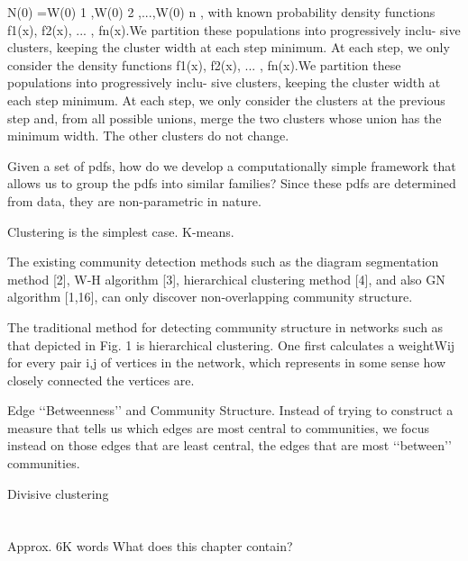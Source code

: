 \documentclass[../main.tex]{subfiles}
\begin{document}
\cite{VoVan2010}
N(0) ={W(0)
1 ,W(0) 2 ,...,W(0) n }, with known probability
density functions {f1(x), f2(x), ... , fn(x)}.We partition these populations into progressively inclu- sive clusters, keeping the cluster width at each step minimum. At each step, we only consider the
density functions {f1(x), f2(x), ... , fn(x)}.We partition these populations into progressively inclu- sive clusters, keeping the cluster width at each step minimum. At each step, we only consider the
clusters at the previous step and, from all possible unions, merge the two clusters whose union
has the minimum width. The other clusters do not change.

\cite{Goh2008}
Given a set of pdfs, how do
we develop a computationally simple framework that allows us to group the pdfs into
similar families? Since these pdfs are determined from data, they are non-parametric in
nature.

\cite{hastie2008}
Clustering is the simplest case. K-means. 

\cite{Lu2012}
    The existing community detection methods such as the
diagram segmentation method [2], W-H algorithm [3], hierarchical clustering method [4], and also GN algorithm [1,16], can
only discover non-overlapping community
structure.


\cite{Girvan2002}
The traditional method for detecting community structure in networks such as that depicted in Fig. 1 is
hierarchical clustering. One first calculates a weightWij for every
pair i,j of vertices in the network, which represents in some sense
how closely connected the vertices are.


Edge ‘‘Betweenness’’ and Community Structure.
Instead of trying to construct a measure that tells us which
edges are most central to communities, we focus instead on those
edges that are least central, the edges that are most ‘‘between’’
communities.

\cite{hastie2008}
Divisive clustering
\section{}





Approx. 6K words
What does this chapter contain?
\end{document}
